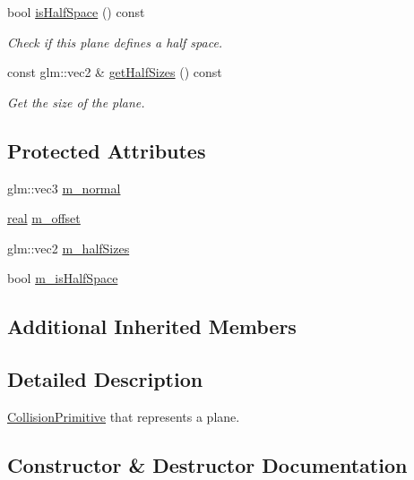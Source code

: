 \begin{DoxyCompactItemize}
bool \mbox{\hyperlink{classr3_1_1_collision_plane_a87f5071d181b4c643b42cb2448464be2}{is\+Half\+Space}} () const
\begin{DoxyCompactList}\small\item\em Check if this plane defines a half space. \end{DoxyCompactList}\item 
const glm\+::vec2 \& \mbox{\hyperlink{classr3_1_1_collision_plane_ab48030fbf5bc17cd5ad81e5eb654a4b4}{get\+Half\+Sizes}} () const
\begin{DoxyCompactList}\small\item\em Get the size of the plane. \end{DoxyCompactList}\end{DoxyCompactItemize}
\subsection*{Protected Attributes}
\begin{DoxyCompactItemize}
\item 
glm\+::vec3 \mbox{\hyperlink{classr3_1_1_collision_plane_ab65e832434d2da433e79c93ac12f4b43}{m\+\_\+normal}}
\item 
\mbox{\hyperlink{namespacer3_ab2016b3e3f743fb735afce242f0dc1eb}{real}} \mbox{\hyperlink{classr3_1_1_collision_plane_a8ae3c28197b05088e405ff9944632f74}{m\+\_\+offset}}
\item 
glm\+::vec2 \mbox{\hyperlink{classr3_1_1_collision_plane_a8e642d9075ceebd029f3869ace65dd5f}{m\+\_\+half\+Sizes}}
\item 
bool \mbox{\hyperlink{classr3_1_1_collision_plane_a6d560c5f7627efec1d094905ec4e7d60}{m\+\_\+is\+Half\+Space}}
\end{DoxyCompactItemize}
\subsection*{Additional Inherited Members}


\subsection{Detailed Description}
\mbox{\hyperlink{classr3_1_1_collision_primitive}{Collision\+Primitive}} that represents a plane. 

\subsection{Constructor \& Destructor Documentation}
\mbox{\label{classr3_1_1_collision_plane_ae3f8642b62667018e4a4c3120880fd0f}} 
